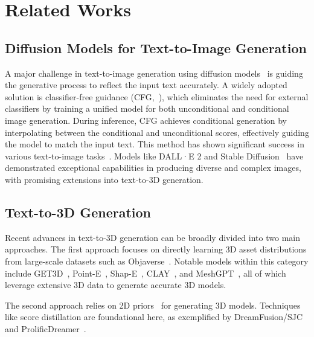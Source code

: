 \section{Related Works}
\subsection{Diffusion Models for Text-to-Image Generation}
A major challenge in text-to-image generation using diffusion models~\citep{yu2024beyond, liu2024drag, xu2024dreamanime} is guiding the generative process to reflect the input text accurately. A widely adopted solution is classifier-free guidance (CFG,~\cite{ho2022classifier}), which eliminates the need for external classifiers by training a unified model for both unconditional and conditional image generation. During inference, CFG achieves conditional generation by interpolating between the conditional and unconditional scores, effectively guiding the model to match the input text. This method has shown significant success in various text-to-image tasks~\citep{balaji2022ediff, nichol2021glide, ramesh2022hierarchical}. Models like DALL·E 2 and Stable Diffusion~\citep{rombach2022high} have demonstrated exceptional capabilities in producing diverse and complex images, with promising extensions into text-to-3D generation.

\subsection{Text-to-3D Generation}
Recent advances in text-to-3D generation can be broadly divided into two main approaches. The first approach focuses on directly learning 3D asset distributions from large-scale datasets such as Objaverse~\citep{deitke2023objaverse}. Notable models within this category include GET3D~\citep{gao2022get3d}, Point-E~\citep{nichol2022point}, Shap-E~\citep{jun2023shap}, CLAY~\citep{zhang2024clay}, and MeshGPT~\citep{siddiqui2024meshgpt}, all of which leverage extensive 3D data to generate accurate 3D models.

The second approach relies on 2D priors~\citep{jiang2023diffuse3d} for generating 3D models. Techniques like score distillation are foundational here, as exemplified by DreamFusion/SJC~\citep{poole2022dreamfusion, wang2023score} and ProlificDreamer~\citep{wang2024prolificdreamer}.

